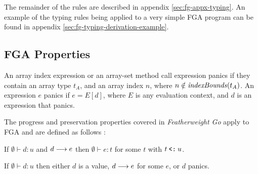 The remainder of the rules are described in appendix \ref{sec:fg-appx-typing}.
An example of the typing rules being applied to a very simple FGA program can be
found in appendix \ref{sec:fg-typing-derivation-example}.




\subsection{FGA Properties}

An array index expression or an array-set method call expression panics if they
contain an array type $t_A$, and an array index $n$, where $n \notin
    \mathit{indexBounds}(t_A)$. An expression $e$ panics if $e = E[d]$, where $E$ is any
evaluation context, and $d$ is an expression that panics.

The progress and preservation properties covered in \emph{Featherweight Go}
apply to FGA and are defined as follows \autocite{fg}:

\begin{theorem}[Preservation]
    If\/ $\emptyset \vdash d : u$ and $d \longrightarrow e$
    then\/ $\emptyset \vdash e : t$ for some $t$
    with\/ $t \mathbin{\texttt{<:}} u$.
\end{theorem}

\begin{theorem}[Progress]
    If\/ $\emptyset \vdash d:u$ then
    either\/ $d$ is a value,
    $d \longrightarrow e$ for some $e$,
    or\/ $d$ panics.
\end{theorem}

